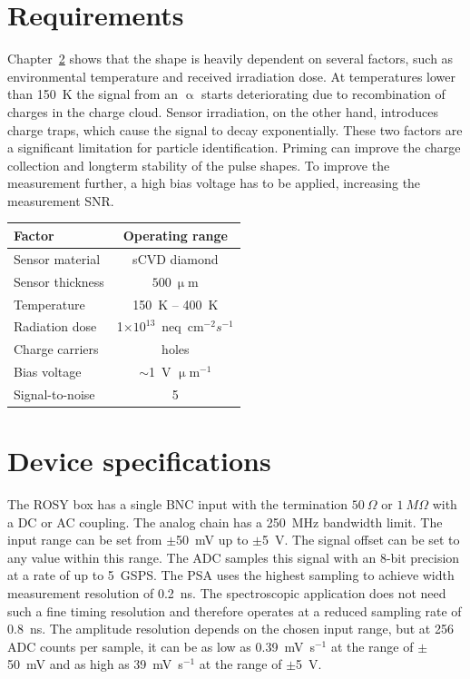 \section{Requirements}
Chapter~\ref{} shows that the shape is heavily dependent on several factors, such as environmental temperature and received irradiation dose. At temperatures lower than 150~K the signal from an $\upalpha$ starts deteriorating due to recombination of charges in the charge cloud. Sensor irradiation, on the other hand, introduces charge traps, which cause the signal to decay exponentially. These two factors are a significant limitation for particle identification. Priming can improve the charge collection and longterm stability of the pulse shapes. To improve the measurement further, a high bias voltage has to be applied, increasing the measurement SNR. 
\begin{center}
\begin{tabular}{l*{1}{c}}
Factor              & Operating range \\
\hline
Sensor material & sCVD diamond \\
Sensor thickness & $500~\upmu$m \\
Temperature & 150~K -- 400~K \\
Radiation dose & 1$\times10^{13}$~neq~cm$^{-2} s^{-1}$ \\
Charge carriers & holes \\
Bias voltage & $\sim$1~V $\upmu$m$^{-1}$ \\
Signal-to-noise & 5 \\
\end{tabular}
\label{tab:limits}
\end{center}



\section{Device specifications}
The ROSY box has a single BNC input with the termination $50~\Omega$ or $1~M\Omega$ with a DC or AC coupling. The analog chain has a 250~MHz bandwidth limit. The input range can be set from $\pm$50~mV up to $\pm$5~V. The signal offset can be set to any value within this range. The ADC samples this signal with an 8-bit precision at a rate of up to 5~GSPS. The PSA uses the highest sampling to achieve width measurement resolution of 0.2~ns. The spectroscopic application does not need such a fine timing resolution and therefore operates at a reduced sampling rate of 0.8~ns. The amplitude resolution depends on the chosen input range, but at 256 ADC counts per sample, it can be as low as 0.39~mV~s$^{-1}$ at the range of $\pm$50~mV and as high as 39~mV~s$^{-1}$ at the range of $\pm$5~V.

